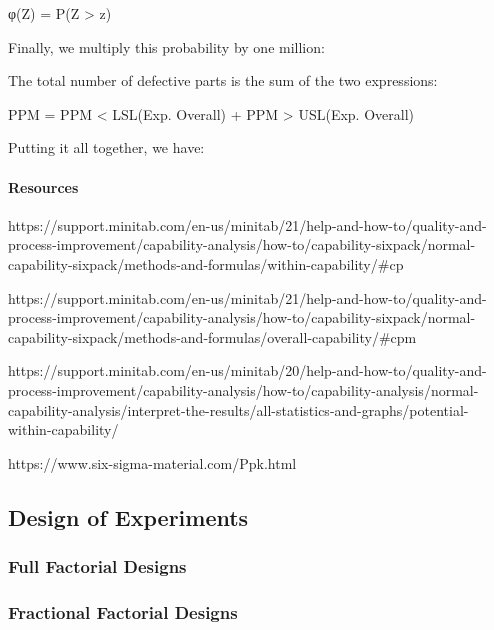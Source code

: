 \documentclass[11pt]{article}
\begin{document}
φ(Z) = P(Z \textgreater{} z)

Finally, we multiply this probability by one million:

The total number of defective parts is the sum of the two expressions:

PPM = PPM \textless{} LSL(Exp. Overall) + PPM \textgreater{} USL(Exp.
Overall)

Putting it all together, we have:

\hypertarget{resources}{%
\paragraph{Resources}\label{resources}}

https://support.minitab.com/en-us/minitab/21/help-and-how-to/quality-and-process-improvement/capability-analysis/how-to/capability-sixpack/normal-capability-sixpack/methods-and-formulas/within-capability/\#cp

https://support.minitab.com/en-us/minitab/21/help-and-how-to/quality-and-process-improvement/capability-analysis/how-to/capability-sixpack/normal-capability-sixpack/methods-and-formulas/overall-capability/\#cpm

https://support.minitab.com/en-us/minitab/20/help-and-how-to/quality-and-process-improvement/capability-analysis/how-to/capability-analysis/normal-capability-analysis/interpret-the-results/all-statistics-and-graphs/potential-within-capability/

https://www.six-sigma-material.com/Ppk.html

    

    \hypertarget{design-of-experiments}{%
\subsection{Design of Experiments}\label{design-of-experiments}}

\hypertarget{full-factorial-designs}{%
\subsubsection{Full Factorial Designs}\label{full-factorial-designs}}

\hypertarget{fractional-factorial-designs}{%
\subsubsection{Fractional Factorial
Designs}\label{fractional-factorial-designs}}
\end{document}

